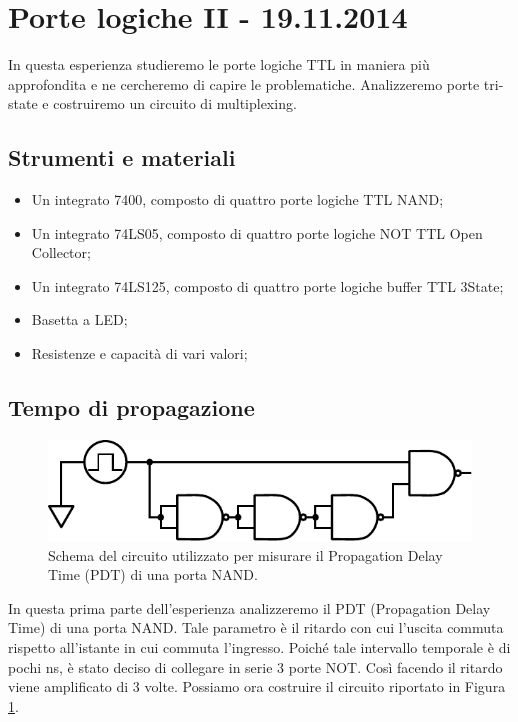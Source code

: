\section{Porte logiche II - 19.11.2014}

In questa esperienza studieremo le porte logiche TTL in maniera più approfondita e ne cercheremo di capire le problematiche. Analizzeremo porte tri-state e costruiremo un circuito di multiplexing.

\subsection*{Strumenti e materiali}

\begin{itemize} [noitemsep]
	\item Un integrato 7400, composto di quattro porte logiche TTL NAND; %
	\item Un integrato 74LS05, composto di quattro porte logiche NOT TTL Open Collector;
	\item Un integrato 74LS125, composto di quattro porte logiche buffer TTL 3State;
	\item Basetta a LED;		
	\item Resistenze e capacità di vari valori;
\end{itemize}

\subsection{Tempo di propagazione}

\begin{figure}
\centering
\includegraphics[width=.4\textwidth]{../E10/latex/delay.pdf}
\caption{Schema del circuito utilizzato per misurare il Propagation Delay Time (PDT) di una porta NAND.}
\label{cir10:delay}
\end{figure}


In questa prima parte dell'esperienza analizzeremo il PDT (Propagation Delay Time) di una porta NAND.
Tale parametro è il ritardo con cui l'uscita commuta rispetto all'istante in cui commuta l'ingresso.
Poiché tale intervallo temporale è di pochi \si{\nano\second}, è stato deciso di collegare in serie 3 porte NOT.
Così facendo il ritardo viene amplificato di 3 volte.
Possiamo ora costruire il circuito riportato in Figura \ref{cir10:delay}.

